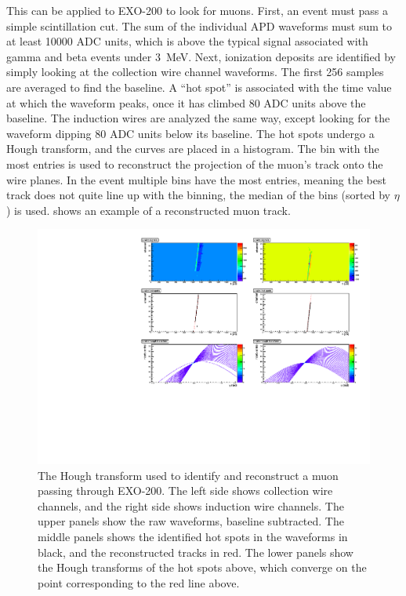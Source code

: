 \documentclass[herrin-thesis.tex]{subfiles}
\begin{document}
This can be applied to EXO-200 to look for muons. First, an event must pass a simple scintillation cut. The sum of the individual APD waveforms must sum to at least 10000 ADC units, which is  above the typical signal associated with gamma and beta events under \SI{3}{MeV}. Next, ionization deposits are identified by simply looking at the collection wire channel waveforms. The first 256 samples are averaged to find the baseline.  A ``hot spot'' is associated with the time value at which the waveform peaks, once it has climbed 80 ADC units above the baseline. The induction wires are analyzed the same way, except looking for the waveform dipping 80 ADC units below its baseline. The hot spots undergo a Hough transform, and the curves are placed in a histogram. The bin with the most entries is used to reconstruct the projection of the muon's track onto the wire planes. In the event multiple bins have the most entries, meaning the best track does not quite line up with the binning, the median of the bins (sorted by \(\eta\)) is used.  shows an example of a reconstructed muon track.

\begin{figure}[tp]
\centering
\includegraphics[width=1\columnwidth]{./plots/muon_houghtransform_run_4685_ev_67.pdf}
\caption[Identifying a muon with the Hough transform]{The Hough transform used to identify and reconstruct a muon passing through EXO-200. The left side shows collection wire channels, and the right side shows induction wire channels. The upper panels show the raw waveforms, baseline subtracted. The middle panels shows the identified hot spots in the waveforms in black, and the reconstructed tracks in red. The lower panels show the Hough transforms of the hot spots above, which converge on the point corresponding to the red line above.}
\label{fig:muon:houghtransform}
\end{figure}
\end{document}
